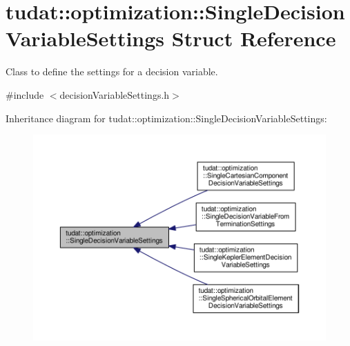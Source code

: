 \hypertarget{structtudat_1_1optimization_1_1SingleDecisionVariableSettings}{}\section{tudat\+:\+:optimization\+:\+:Single\+Decision\+Variable\+Settings Struct Reference}
\label{structtudat_1_1optimization_1_1SingleDecisionVariableSettings}


Class to define the settings for a decision variable.  




{\ttfamily \#include $<$decision\+Variable\+Settings.\+h$>$}



Inheritance diagram for tudat\+:\+:optimization\+:\+:Single\+Decision\+Variable\+Settings\+:
\nopagebreak
\begin{figure}[H]
\begin{center}
\leavevmode
\includegraphics[width=350pt]{structtudat_1_1optimization_1_1SingleDecisionVariableSettings__inherit__graph}
\end{center}
\end{figure}
